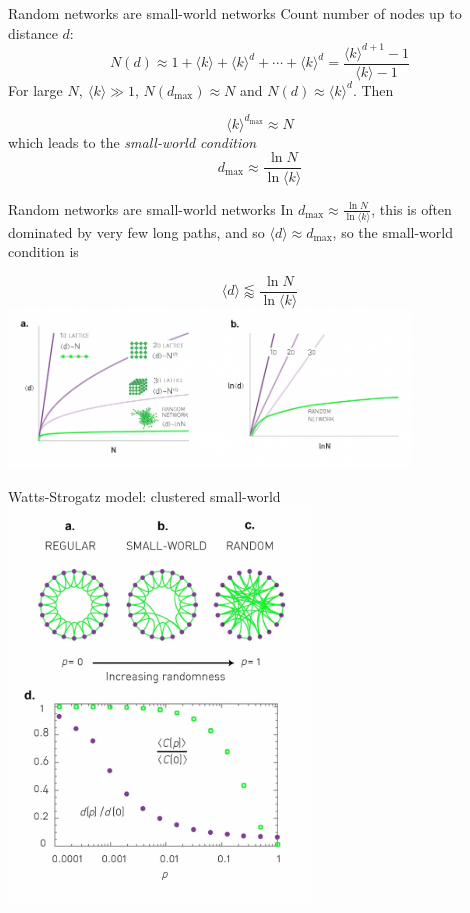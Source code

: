 \documentclass{beamer}
\begin{document}
\begin{frame}{Random networks are small-world networks}
  \centering
  Count number of nodes up to distance $d$:
  \[
    N(d) \approx 
      1 + \langle k \rangle + \langle k \rangle^d + \cdots + \langle k \rangle^d =
      \frac{\langle k \rangle^{d+1} - 1}{\langle k \rangle - 1}
  \]
  For large $N,~\langle k \rangle \gg 1$, $N(d_{\max}) \approx N$ and 
  $N(d) \approx \langle k \rangle^d$. Then 

  \[\langle k \rangle^{d_{\max}} \approx N\]
  which leads to the \emph{small-world condition}
  \[d_{\max} \approx \frac{\ln N}{\ln \langle k \rangle}\]
\end{frame}

\begin{frame}{Random networks are small-world networks}
  In $d_{\max} \approx \frac{\ln N}{\ln \langle k \rangle}$, this is often
  dominated by very few long paths, and so $\langle d \rangle \approx d_{\max}$,
  so the small-world condition is

  \[
    \langle d \rangle \lessapprox \frac{\ln N}{\ln \langle k \rangle}
  \]
  \centering
  \includegraphics[width=0.8\textwidth]{Figures/randomSmallWorld.jpg} 
\end{frame}

\begin{frame}{Watts-Strogatz model: clustered small-world}
  \vspace{-1em}
  \centering
  \includegraphics[width=0.6\textwidth]{Figures/wattsStrogatz.jpg}
\end{frame}
\end{document}
